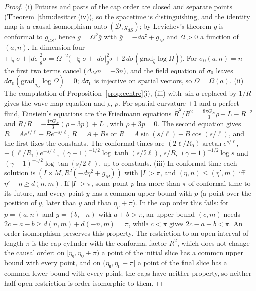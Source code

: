 \documentclass[aps,pra,onecolumn,superscriptaddress,nofootinbib,10pt]{revtex4-2}
\theoremstyle{definition}
\theoremstyle{remark}
\newcommand{\cD}{\mathcal{D}}
\begin{document}
\begin{proof}
(i) Futures and pasts of the cap order are closed and separate points (Theorem~\ref{thm:desitter}(iv)), so the
spacetime is distinguishing, and the identity map is a causal isomorphism onto $(\cD,g_{dS})$; by Levichev's
theorem \cite{Levichev87} $g$ is conformal to $g_{dS}$, hence $g=\Omega^2\bar g$ with $\bar g=-da^2+g_M$ and $\Omega>0$ a
function of $(a,n)$.  In dimension four $\Box_g\sigma+\lvert d\sigma\rvert_g^2\sigma=\Omega^{-2}\bigl(\Box_{\bar g}\sigma+\lvert d\sigma\rvert_{\bar g}^2\sigma+2\,d\sigma(\mathrm{grad}_{\bar g}\log\Omega)\bigr)$.  For
$\sigma_0(a,n)=n$ the first two terms cancel ($\Delta_Mn=-3n$), and the field equation of $\sigma_0$ leaves
$d\sigma_0(\mathrm{grad}_{g_M}\log\Omega)=0$; $d\sigma_0$ is injective on spatial vectors, so $\Omega=\Omega(a)$.
(ii) The computation of Proposition~\ref{prop:centre}(i), (iii) with $\sin a$ replaced by $1/R$ gives the
wave-map equation and $\rho$, $p$.  For spatial curvature $+1$ and a perfect fluid, Einstein's equations
are the Friedmann equations $\dot R^2/R^2=\tfrac{8\pi G_N}3\rho+L-R^{-2}$ and
$\ddot R/R=-\tfrac{4\pi G_N}3(\rho+3p)+L$ \cite{HawkingEllis}, with $\rho+3p=0$.  The second equation gives
$R=Ae^{s/\ell}+Be^{-s/\ell}$, $R=A+Bs$ or $R=A\sin(s/\ell)+B\cos(s/\ell)$, and the first fixes the constants.  The
conformal times are $(2\ell/R_0)\arctan e^{s/\ell}$, $-(\ell/R_1)e^{-s/\ell}$, $(\gamma-1)^{-1/2}\log\tanh(s/2\ell)$,
$s/R$, $(\gamma-1)^{-1/2}\log s$ and $(\gamma-1)^{-1/2}\log\tan(s/2\ell)$, up to constants.
(iii) In conformal time each solution is $(I\times M,R^2(-d\eta^2+g_M))$ with $\lvert I\rvert>\pi$, and $(\eta,n)\le(\eta',m)$ iff
$\eta'-\eta\ge d(n,m)$.  If $\lvert I\rvert>\pi$, some point $p$ has more than $\pi$ of conformal time to its future, and
every point $y$ has a common upper bound with $p$ (a point over the position of $y$, later than $y$ and than
$\eta_p+\pi$).  In the cap order this fails: for $p=(a,n)$ and $y=(b,-n)$ with $a+b>\pi$, an upper bound $(c,m)$
needs $2c-a-b\ge d(n,m)+d(-n,m)=\pi$, while $c<\pi$ gives $2c-a-b<\pi$.  An order isomorphism preserves this
property.  The restriction to an open interval of length $\pi$ is the cap cylinder with the conformal factor
$R^2$, which does not change the causal order; on $[\eta_0,\eta_0+\pi)$ a point of the initial
slice has a common upper bound with every point, and on $(\eta_0,\eta_0+\pi]$ a point of the final slice has a
common lower bound with every point; the caps have neither property, so neither half-open restriction is
order-isomorphic to them.
\end{proof}
\end{document}
